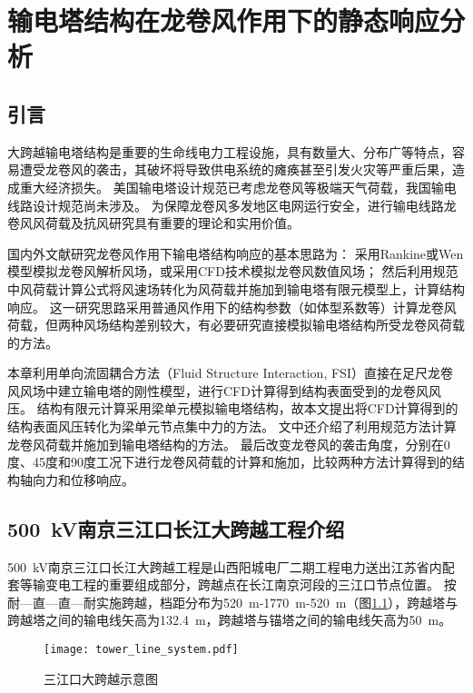 \graphicspath{{figures/static/}}
\chapter{输电塔结构在龙卷风作用下的静态响应分析}\label{chapter:static}

\section{引言}
大跨越输电塔结构是重要的生命线电力工程设施，具有数量大、分布广等特点，容易遭受龙卷风的袭击，其破坏将导致供电系统的瘫痪甚至引发火灾等严重后果，造成重大经济损失。
美国输电塔设计规范已考虑龙卷风等极端天气荷载，我国输电线路设计规范尚未涉及。
为保障龙卷风多发地区电网运行安全，进行输电线路龙卷风风荷载及抗风研究具有重要的理论和实用价值。

国内外文献研究龙卷风作用下输电塔结构响应的基本思路为：
采用Rankine或Wen模型模拟龙卷风解析风场\cite{savory2001modelling}\cite{ren2010tower}\cite{bai2011tornado}，或采用CFD技术模拟龙卷风数值风场\cite{hamada2010finite}\cite{altalmas2014finite}\cite{hamada2011behaviour}；
然后利用规范\cite{wong2009guidelines}\cite{GB50545-2010}中风荷载计算公式将风速场转化为风荷载并施加到输电塔有限元模型上，计算结构响应。
这一研究思路采用普通风作用下的结构参数（如体型系数等）计算龙卷风荷载，但两种风场结构差别较大，有必要研究直接模拟输电塔结构所受龙卷风荷载的方法。

本章利用单向流固耦合方法（Fluid Structure Interaction, FSI）直接在足尺龙卷风风场中建立输电塔的刚性模型，进行CFD计算得到结构表面受到的龙卷风风压。
结构有限元计算采用梁单元模拟输电塔结构，故本文提出将CFD计算得到的结构表面风压转化为梁单元节点集中力的方法。
文中还介绍了利用规范方法计算龙卷风荷载并施加到输电塔结构的方法。
最后改变龙卷风的袭击角度，分别在0度、45度和90度工况下进行龙卷风荷载的计算和施加，比较两种方法计算得到的结构轴向力和位移响应。

\section{\SI{500}{kV}南京三江口长江大跨越工程介绍}
\SI{500}{kV}南京三江口长江大跨越工程是山西阳城电厂二期工程电力送出江苏省内配套等输变电工程的重要组成部分，跨越点在长江南京河段的三江口节点位置。
按耐—直—直—耐实施跨越，档距分布为\SI{520}{m}-\SI{1770}{m}-\SI{520}{m}（图\ref{fig:tower-line}），跨越塔与跨越塔之间的输电线矢高为\SI{132.4}{m}，跨越塔与锚塔之间的输电线矢高为\SI{50}{m}。
\begin{figure}[!htbp]
	\centering
	\texttt{[image: tower\_line\_system.pdf]}
	\caption{三江口大跨越示意图}
	\label{fig:tower-line}
\end{figure}

